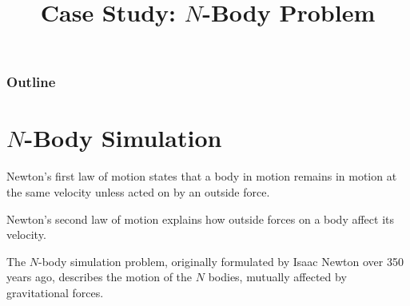 \documentclass[8pt,a4paper,compress,handout]{beamer}
\title{Case Study: $N$-Body Problem}
\date{}
\begin{document}
\begin{frame}
\vfill
\titlepage
\end{frame}

\begin{frame}
\frametitle{Outline}
\tableofcontents
\end{frame}

\section{$N$-Body Simulation}
\begin{frame}[fragile]
Newton's first law of motion states that a body in motion remains in motion at the same velocity unless acted on by an outside force. 

\bigskip

Newton's second law of motion explains how outside forces on a body affect its velocity.

\bigskip

The $N$-body simulation problem, originally formulated by Isaac Newton over 350 years ago, describes the motion of the $N$ bodies, mutually affected by gravitational forces.
\end{frame}
\end{document}
